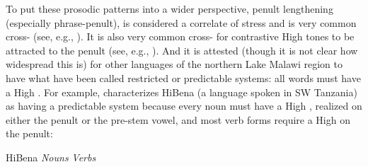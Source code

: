 \documentclass[output=paper
,newtxmath
,modfonts
,nonflat]{langsci/langscibook}
\begin{document}
To put these  prosodic patterns into a wider perspective, penult lengthening (especially phrase-penult), is considered a correlate of stress and is very common cross- (see, e.g., \citealt{Doke1954,Downing2010phrasing,Hyman2013penultimate,Philippson1998}). It is also very common cross- for contrastive High tones to be attracted to the penult (see, e.g., \citealt{Kisseberth&Odden2003,Philippson1998}). And it is attested (though it is not clear how widespread this is) for other languages of the northern Lake Malawi region to have what have been called restricted or predictable  systems: all words must have a High  \citep{Odden1988,Odden1999,Schadeberg1973}. For example, \citet{Odden1988} characterizes HiBena (a  language spoken in SW Tanzania) as having a predictable  system because every noun must have a High , realized on either the penult or the pre-stem vowel, and most verb forms require a High  on the penult:

 
\begin{comment}
\ea\label{ex:downing:3}  HiBena \citep[236]{Odden1988}
\multicolumn{2}{l}{
\ea\label{ex:downing:3a}  \textit{Nouns} 
\downingdouble{mú-goosi}{‘man’}    
\downingdouble{hí-fuva}{‘chest’}     
\downingdouble{mu-guúnda}{‘field’}  
\downingdouble{lu-fwiíli}{‘hair’}
\downingdouble{li-fulúha}{‘cloud’}      }
{
\ex\label{ex:downing:3b} \textit{Verbs}
\downingdouble{kwaamíle}{‘put to pasture’(subjunctive)}
\downingdouble{ndi-líma}{‘I will cultivate’(near-future)}
\downingdouble{ndaa-limága}{‘I used to cultivate’}
\downingdouble{ndaa-limiíge}{‘I was cultivating’}
\downingdouble{ndihaa-limíle}{‘I cultivated’ (intermediate past)}
\downingdouble{ndaa-limíle}{‘I cultivated’ (far past)}
\downingdouble{hu-limíla}{‘to cultivate for’}
\z
}
\z
\end{comment}
\ea\label{ex:downing:3}  HiBena \citep[236]{Odden1988}
\ea\label{ex:downing:3a}  \textit{Nouns}
\sn
{}    
\sn
{}     
\sn
{}  
\sn
{}
\sn
{}      
\ex\label{ex:downing:3b} \textit{Verbs}
\sn
{}
\sn
{}
\sn
{}
\sn
{}
\sn
{}
\sn
{}
\sn
{}
\z
\z
\end{document}
